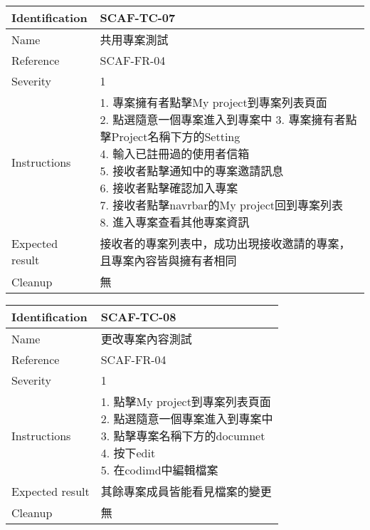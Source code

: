 \documentclass{report}
\begin{document}
\begin{tabularx}{0.9\textwidth}{
  |p{}%
  |p{}|%
  }
  \hline
  \centering Identification &  SCAF-TC-07 \\
  \hline
  \centering Name & 共用專案測試 \\
  \hline
  \centering Reference & SCAF-FR-04 \\
  \hline
  \centering Severity & 1 \\
  \hline
  \centering Instructions & 
  \makecell{
    1. 專案擁有者點擊My project到專案列表頁面 \\
    2. 點選隨意一個專案進入到專案中
    3. 專案擁有者點擊Project名稱下方的Setting \\
    4. 輸入已註冊過的使用者信箱 \\
    5. 接收者點擊通知中的專案邀請訊息 \\
    6. 接收者點擊確認加入專案 \\
    7. 接收者點擊navrbar的My project回到專案列表 \\
    8. 進入專案查看其他專案資訊
  }\\
  \hline
  \centering Expected result & 接收者的專案列表中，成功出現接收邀請的專案，且專案內容皆與擁有者相同 \\
  \hline
  \centering Cleanup & 無 \\
  \hline
\end{tabularx}
\newline\newline

\begin{tabularx}{0.9\textwidth}{
  |p{}%
  |p{}|%
  }
  \hline
  \centering Identification &  SCAF-TC-08 \\
  \hline
  \centering Name & 更改專案內容測試 \\
  \hline
  \centering Reference & SCAF-FR-04 \\
  \hline
  \centering Severity & 1 \\
  \hline
  \centering Instructions & 
  \makecell{
    1. 點擊My project到專案列表頁面 \\
    2. 點選隨意一個專案進入到專案中 \\
    3. 點擊專案名稱下方的documnet \\
    4. 按下edit \\
    5. 在codimd中編輯檔案
  }\\
  \hline
  \centering Expected result & 其餘專案成員皆能看見檔案的變更 \\
  \hline
  \centering Cleanup & 無 \\
  \hline
\end{tabularx}
\newline\newline
\end{document}
